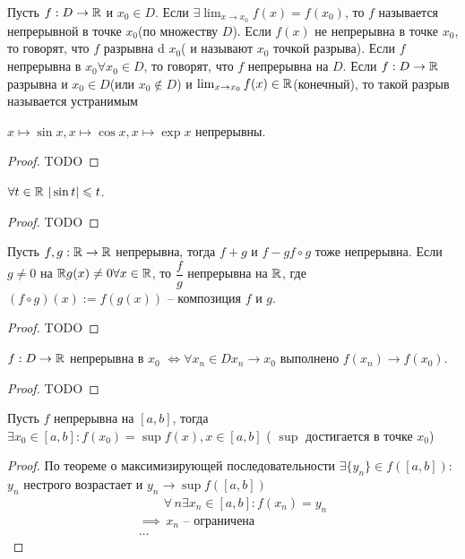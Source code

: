 \begin{definition}
	Пусть $ f: D \to \mathbb{R} $ и $ x_0 \in D $. Если $ \exists \lim_{x \to x_0} f(x) = f(x_0)$, то $ f $ называется непрерывной в точке $ x_0 $(по множеству $ D $). Если $ f(x) $ не непрерывна в точке $ x_0 $,  то говорят, что $ f $ разрывна d $ x_0 $( и называют $ x_0 $ точкой разрыва).
	Если $ f $ непрерывна в $ x_0 \forall  x_0 \in  D $, то говорят, что $ f $ непрерывна на $ D $.
	Если $ f: D \to \mathbb{R} $ разрывна и $ x_0 \in D$(или $ x_0 \notin D $) и $ \lim_{x \to x_0}f(x) \in \mathbb{R} $(конечный), то такой разрыв называется устранимым
\end{definition}
\begin{proposition}
	 $ x \mapsto \sin x, x \mapsto \cos x, x \mapsto \exp x $ непрерывны.
\end{proposition} \begin{proof}
	TODO
\end{proof}
\begin{lemma}
	 $ \forall t \in \mathbb{R} \ |\sin t| \leqslant  t $.
\end{lemma} \begin{proof}
	TODO
\end{proof}
\begin{proposition}
	Пусть $ f, g : \mathbb{R} \to \mathbb{R}$ непрерывна, тогда $ f + g \text{ и } f - g f \circ g $ тоже непрерывна. Если $ g \neq  0 $ на $ \mathbb{R} g(x) \neq  0 \forall  x \in \mathbb{R} $, то $ \dfrac{f}{g}  $ непрерывна на $ \mathbb{R} $, где $ (f \circ g)(x) := f(g(x)) $ -- композиция $ f $ и $ g $.
\end{proposition}
\begin{proof}
	TODO
\end{proof}
\begin{note}
	 $ f: D \to  \mathbb{R} $ непрерывна в $ x_0 $ $ \Longleftrightarrow  \forall x_n \in D x_n \to x_0$ выполнено $ f(x_n) \to f(x_0)$.
\end{note}
\begin{proof}
	TODO
\end{proof}
\begin{theorem}
	Пусть $ f $ непрерывна на $ [a, b] $, тогда $ \exists x_0 \in [a, b]: f(x_0) = \sup f(x), x \in [a, b] $ ( $ \sup $ достигается в точке $ x_0 $)
\end{theorem} \begin{proof}
	По теореме о максимизирующей последовательности $ \exists \{y_n\} \in f([a, b]) $:
	 $ y_n $ нестрого возрастает и $ y_n \to \sup f([a, b]) $ 
	 \begin{gather}
		\phantom \implies \forall\, n \exists x_n \in [a, b]: f(x_n) = y_n \\
		 \implies\, x_n \text{ -- ограничена } \\
		 \dots 
	\end{gather}
	
\end{proof}
